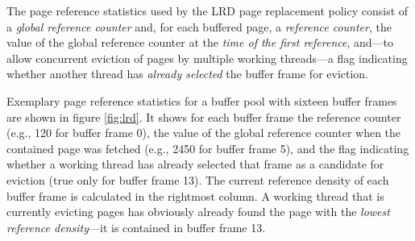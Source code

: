     The page reference statistics used by the LRD page replacement policy consist of a \emph{global reference counter} and, for each buffered page, a \emph{reference counter}, the value of the global reference counter at the \emph{time of the first reference}, and---to allow concurrent eviction of pages by multiple working threads---a flag indicating whether another thread has \emph{already selected} the buffer frame for eviction.

    Exemplary page reference statistics for a buffer pool with sixteen buffer frames are shown in figure \ref{fig:lrd}. It shows for each buffer frame the reference counter (e.g., 120 for buffer frame 0), the value of the global reference counter when the contained page was fetched (e.g., 2450 for buffer frame 5), and the flag indicating whether a working thread has already selected that frame as a candidate for eviction (true only for buffer frame 13). The current reference density of each buffer frame is calculated in the rightmost column. A working thread that is currently evicting pages has obviously already found the page with the \emph{lowest reference density}---it is contained in buffer frame 13.

